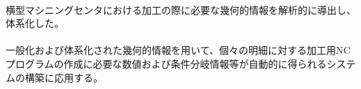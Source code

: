 {\paragraph*{\tpartconclusion}
横型マシニングセンタにおける加工の際に必要な幾何的情報を解析的に導出し、体系化した。
\tcbline*
\paragraph*{\tpartnextstep}
一般化および体系化された幾何的情報を用いて、個々の明細に対する加工用NCプログラムの作成に必要な数値および条件分岐情報等が自動的に得られるシステムの構築に応用する。
}














\begin{appendices}
\Appendixpart



{\small}
\end{appendices}

